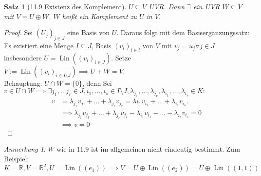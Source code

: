 \documentclass[a4paper]{scrartcl}
\DeclareMathOperator{\Exists}{\exists}
\DeclareMathOperator{\Forall}{\forall}
\DeclareMathOperator{\Lin}{Lin}
\theoremstyle{definition}
\theoremstyle{plain}
\newtheorem{thm}{Satz}
\theoremstyle{plain}
\theoremstyle{remark}
\theoremstyle{remark}
\newtheorem{note}{Anmerkung}
\theoremstyle{remark}
\theoremstyle{remark}
\theoremstyle{remark}
\begin{document}
\begin{thm}[11.9 Existenz des Komplement]
$U\subseteq V$ UVR. Dann $\Exists$ ein UVR $W\subseteq V$ mit $V = U\oplus W$. $W$ heißt ein Komplement zu $U$ in $V$.
\end{thm}
\begin{proof}
Sei $(U_j)_{j\in J}$ eine Basis von $U$. Daraus folgt mit dem Basisergänzungssatz: Es existiert eine Menge $I \subseteq J$, Basis $(v_i)_{i\in i}$ von $V$ mit $v_j = u_j \Forall j\in J$
insbesondere $U = \Lin((v_i)_{i\in J})$. Setze $V := \Lin((v_i)_{i\in I\setminus J}) \implies U + W = V$. \\
  Behauptung: $U \cap W = \{0\}$, denn Sei $v \in U \cap W \implies \Exists j_1, \ldots j_r \in J, i_1, \ldots, i_s \in I \setminus J, \lambda_{j_1}, \ldots, \lambda_{j_r}, \lambda_{i_1}, \ldots, \lambda_{i_s} \in K:$
\begin{align*}
v &= \lambda_{j_1}v_{j_1} + \ldots + \lambda_{j_r} v_{j_r} = \lambda{i_1}v_{i_1} + \ldots + \lambda_{i_s} v_{i_s}. \\
&\implies \lambda_{j_1} v_{j_1} + \ldots + \lambda_{j_r} v_{j_r} - \lambda_{i_1} v_{i_1} - \ldots - \lambda_{i_s} v_{i_s} = 0 \\
&\implies v = 0
\end{align*}
\end{proof}
\begin{note}
$W$ wie in 11.9 ist im allgemeinen nicht eindeutig bestimmt. Zum Beispiel:
\[K = \mathbb{R}, V = \mathbb{R}^2, U = \Lin((e_1)) \implies V = U \oplus \Lin((e_2)) = U \oplus \Lin((1,1))\]
\end{note}
\end{document}
